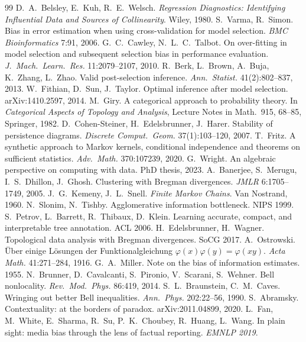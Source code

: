 \documentclass[11pt]{article}
\theoremstyle{definition}
\theoremstyle{remark}
\begin{document}
\begin{thebibliography}{99}
 D.~A.~Belsley, E.~Kuh, R.~E.~Welsch. \emph{Regression Diagnostics: Identifying Influential Data and Sources of Collinearity}. Wiley, 1980.
 S.~Varma, R.~Simon. Bias in error estimation when using cross-validation for model selection. \emph{BMC Bioinformatics} 7:91, 2006.
 G.~C.~Cawley, N.~L.~C.~Talbot. On over-fitting in model selection and subsequent selection bias in performance evaluation. \emph{J.\ Mach.\ Learn.\ Res.} 11:2079--2107, 2010.
 R.~Berk, L.~Brown, A.~Buja, K.~Zhang, L.~Zhao. Valid post-selection inference. \emph{Ann.\ Statist.} 41(2):802--837, 2013.
 W.~Fithian, D.~Sun, J.~Taylor. Optimal inference after model selection. arXiv:1410.2597, 2014.
 M.~Giry. A categorical approach to probability theory. In \emph{Categorical Aspects of Topology and Analysis}, Lecture Notes in Math.\ 915, 68--85, Springer, 1982.
 D.~Cohen-Steiner, H.~Edelsbrunner, J.~Harer. Stability of persistence diagrams. \emph{Discrete Comput.\ Geom.} 37(1):103--120, 2007.
 T.~Fritz. A synthetic approach to Markov kernels, conditional independence and theorems on sufficient statistics. \emph{Adv.\ Math.} 370:107239, 2020.
 G.~Wright. An algebraic perspective on computing with data. PhD thesis, 2023.
 A.~Banerjee, S.~Merugu, I.~S.~Dhillon, J.~Ghosh. Clustering with Bregman divergences. \emph{JMLR} 6:1705--1749, 2005.
 J.~G.~Kemeny, J.~L.~Snell. \emph{Finite Markov Chains}. Van Nostrand, 1960.
 N.~Slonim, N.~Tishby. Agglomerative information bottleneck. NIPS 1999.
 S.~Petrov, L.~Barrett, R.~Thibaux, D.~Klein. Learning accurate, compact, and interpretable tree annotation. ACL 2006.
 H.~Edelsbrunner, H.~Wagner. Topological data analysis with Bregman divergences. SoCG 2017.
 A.~Ostrowski. \"Uber einige L\"osungen der Funktionalgleichung $\varphi(x)\varphi(y)=\varphi(xy)$. \emph{Acta Math.} 41:271--284, 1916.
 G.~A.~Miller. Note on the bias of information estimates. 1955.
 N.~Brunner, D.~Cavalcanti, S.~Pironio, V.~Scarani, S.~Wehner. Bell nonlocality. \emph{Rev.\ Mod.\ Phys.} 86:419, 2014.
 S.~L.~Braunstein, C.~M.~Caves. Wringing out better Bell inequalities. \emph{Ann.\ Phys.} 202:22--56, 1990.
 S.~Abramsky. Contextuality: at the borders of paradox. arXiv:2011.04899, 2020.
 L.~Fan, M.~White, E.~Sharma, R.~Su, P.~K.~Choubey, R.~Huang, L.~Wang. In plain sight: media bias through the lens of factual reporting. \emph{EMNLP 2019}.

\end{thebibliography}
\end{document}

